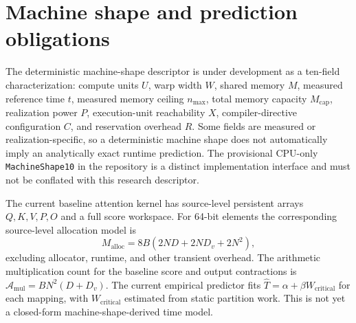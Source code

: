 \documentclass[11pt]{article}
\begin{document}
\section{Machine shape and prediction obligations}
The deterministic machine-shape descriptor is under development as a ten-field characterization: compute units $U$, warp width $W$, shared memory $M$, measured reference time $t$, measured memory ceiling $n_{\max}$, total memory capacity $M_{\mathrm{cap}}$, realization power $P$, execution-unit reachability $X$, compiler-directive configuration $C$, and reservation overhead $R$. Some fields are measured or realization-specific, so a deterministic machine shape does not automatically imply an analytically exact runtime prediction. The provisional CPU-only \texttt{MachineShape10} in the repository is a distinct implementation interface and must not be conflated with this research descriptor.

The current baseline attention kernel has source-level persistent arrays $Q,K,V,P,O$ and a full score workspace. For 64-bit elements the corresponding source-level allocation model is
\begin{equation}M_{\mathrm{alloc}}=8B(2ND+2ND_v+2N^2),\end{equation}
excluding allocator, runtime, and other transient overhead. The arithmetic multiplication count for the baseline score and output contractions is $\mathcal{A}_{\mathrm{mul}}=B N^2(D+D_v)$. The current empirical predictor fits $\widehat{T}=\alpha+\beta W_{\mathrm{critical}}$ for each mapping, with $W_{\mathrm{critical}}$ estimated from static partition work. This is not yet a closed-form machine-shape-derived time model.
\end{document}
